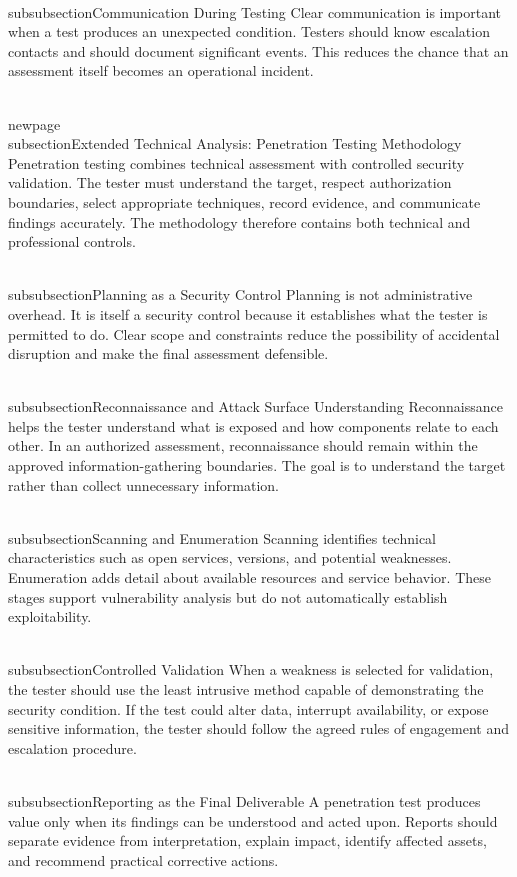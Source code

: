 \documentclass[11pt,a4paper]{article}
\begin{document}
\\subsubsection{Communication During Testing}
Clear communication is important when a test produces an unexpected condition. Testers should know escalation contacts and should document significant events. This reduces the chance that an assessment itself becomes an operational incident.

\\newpage
\\subsection{Extended Technical Analysis: Penetration Testing Methodology}
Penetration testing combines technical assessment with controlled security validation. The tester must understand the target, respect authorization boundaries, select appropriate techniques, record evidence, and communicate findings accurately. The methodology therefore contains both technical and professional controls.

\\subsubsection{Planning as a Security Control}
Planning is not administrative overhead. It is itself a security control because it establishes what the tester is permitted to do. Clear scope and constraints reduce the possibility of accidental disruption and make the final assessment defensible.

\\subsubsection{Reconnaissance and Attack Surface Understanding}
Reconnaissance helps the tester understand what is exposed and how components relate to each other. In an authorized assessment, reconnaissance should remain within the approved information-gathering boundaries. The goal is to understand the target rather than collect unnecessary information.

\\subsubsection{Scanning and Enumeration}
Scanning identifies technical characteristics such as open services, versions, and potential weaknesses. Enumeration adds detail about available resources and service behavior. These stages support vulnerability analysis but do not automatically establish exploitability.

\\subsubsection{Controlled Validation}
When a weakness is selected for validation, the tester should use the least intrusive method capable of demonstrating the security condition. If the test could alter data, interrupt availability, or expose sensitive information, the tester should follow the agreed rules of engagement and escalation procedure.

\\subsubsection{Reporting as the Final Deliverable}
A penetration test produces value only when its findings can be understood and acted upon. Reports should separate evidence from interpretation, explain impact, identify affected assets, and recommend practical corrective actions.
\end{document}
